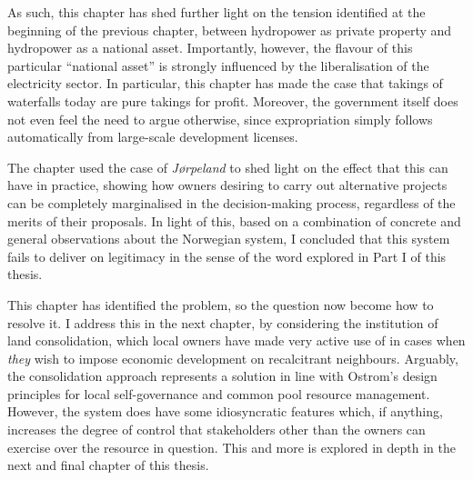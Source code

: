 As such, this chapter has shed further light on the tension identified at the beginning of the previous chapter, between hydropower as private property and hydropower as a national asset. Importantly, however, the flavour of this particular ``national asset'' is strongly influenced by the liberalisation of the electricity sector. In particular, this chapter has made the case that takings of waterfalls today are pure takings for profit. Moreover, the government itself does not even feel the need to argue otherwise, since expropriation simply follows automatically from large-scale development licenses.

The chapter used the case of {\it Jørpeland} to shed light on the effect that this can have in practice, showing how owners desiring to carry out alternative projects can be completely marginalised in the decision-making process, regardless of the merits of their proposals. In light of this, based on a combination of concrete and general observations about the Norwegian system, I concluded that this system fails to deliver on legitimacy in the sense of the word explored in Part I of this thesis. 

This chapter has identified the problem, so the question now become how to resolve it. I address this in the next chapter, by considering the institution of land consolidation, which local owners have made very active use of in cases when {\it they} wish to impose economic development on recalcitrant neighbours. Arguably, the consolidation approach represents a solution in line with Ostrom's design principles for local self-governance and common pool resource management. However, the system does have some idiosyncratic features which, if anything, increases the degree of control that stakeholders other than the owners can exercise over the resource in question. This and more is explored in depth in the next and final chapter of this thesis.

